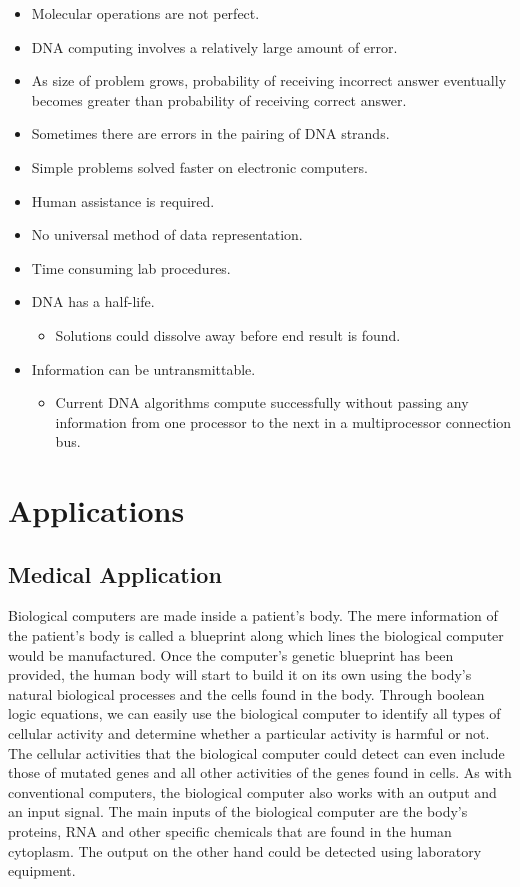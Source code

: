     \begin{itemize}
    \item {Molecular operations are not perfect.}
    \item {DNA computing involves a relatively large amount of error.}
    \item {As size of problem grows, probability of receiving incorrect answer eventually becomes greater than probability of receiving correct answer.}
    \item {Sometimes there are errors in the pairing of DNA strands.}
        \item {Simple problems solved faster on electronic computers.}
    \item {Human assistance is required.}
    \item {No universal method of data representation.}
    \item {Time consuming lab procedures.}
        \item {DNA has a half-life.
          \begin{itemize}
        \item{Solutions could dissolve away before end result is found.}
      \end{itemize}
            }
        \item {Information can be untransmittable.
          \begin{itemize}
        \item{Current DNA algorithms compute successfully without passing any information from one processor to the next in a multiprocessor connection bus.}
      \end{itemize}
            }
  \end{itemize}

\section{Applications}

\subsection{Medical Application}

Biological computers are made inside a patient’s body. The mere information of the patient’s body is called a blueprint along which lines the biological computer would be manufactured. Once the computer’s genetic blueprint has been provided, the human body will start to build it on its own using the body’s natural biological processes  and the cells found in the body. Through boolean logic equations, we can easily use the biological computer to identify all types of cellular  activity and determine whether a particular activity is harmful or not. The cellular activities that the biological computer could detect can even include those of mutated genes and all other activities of the genes found in cells. As with conventional computers, the biological computer also works with an output and an input signal. The main inputs of the biological computer are the body’s proteins, RNA and other specific chemicals that are found in the human cytoplasm. The output on the other hand could be detected using laboratory equipment.

